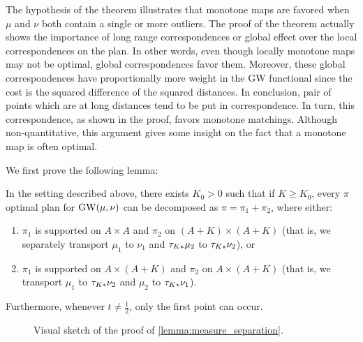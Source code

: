             \begin{remark}
            The hypothesis of the theorem illustrates that monotone maps are favored when $\mu$ and $\nu$ both contain a single or more outliers.
            The proof of the theorem actually shows the importance of long range correspondences or global effect over the local correspondences on the plan. In other words, even though locally monotone maps may not be optimal, global correspondences favor them. Moreover, these global correspondences have proportionally more weight in the GW functional since the cost is the squared difference of the squared distances. In conclusion, pair of points which are at long distances tend to be put in correspondence. In turn, this correspondence, as shown in the proof, favors monotone matchings. Although non-quantitative, this argument gives some insight on the fact that a monotone map is often optimal.
            \end{remark}
            \noindent We first prove the following lemma:
            \begin{lemma}\label{lemma:measure_separation}
            In the setting described above, there exists $K_0>0$ such that if $K \geq K_0$,
            every $\pi$ optimal plan for $\operatorname{GW}(\mu,\nu)$ can be decomposed as $\pi = \pi_1 + \pi_2$, where either:
            \begin{enumerate}
                \item $\pi_1$ is supported on $A \times A$ and $\pi_2$ on $(A + K) \times (A + K)$ (that is, we separately transport $\mu_1$ to $\nu_1$ and $\tau_{K*}\mu_2$ to $\tau_{K*}\nu_2$), or
                \item $\pi_1$ is supported on $A \times (A+K)$ and $\pi_2$ on $A \times (A + K)$ (that is, we transport $\mu_1$ to $\tau_{K*}\nu_2$ and $\mu_2$ to $\tau_{K*}\nu_1$).
            \end{enumerate}
            Furthermore, whenever $t \neq \frac{1}{2}$, only the first point can occur.
            \end{lemma}

                \begin{figure}[h]
                    \centering
                    
                    \caption{Visual sketch of the proof of \cref{lemma:measure_separation}.}
                    \label{FigPositiveResult}
                \end{figure}


